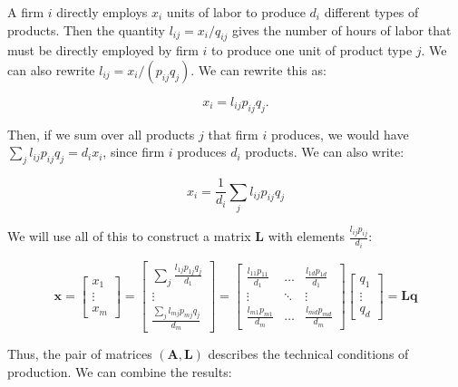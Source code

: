 A firm $i$ directly employs $x_{i}$ units of labor to produce $d_{i}$ different types of products. Then the quantity $l_{ij}=x_{i}/q_{ij}$ gives the number of hours of labor that must be directly employed by firm $i$ to produce one unit of product type $j$. We can also rewrite $l_{ij}=x_{i}/\left(p_{ij}q_{j}\right)$. We can rewrite this as:

\begin{equation}
x_{i}=l_{ij}p_{ij}q_{j}.
\end{equation}

Then, if we sum over all products $j$ that firm $i$ produces, we would have $\sum_{j}l_{ij}p_{ij}q_{j}=d_{i}x_{i}$, since firm $i$ produces $d_{i}$ products. We can also write:


\begin{equation}
x_{i}=\frac{1}{d_{i}}\sum_{j}l_{ij}p_{ij}q_{j}
\end{equation}

We will use all of this to construct a matrix $\boldsymbol{L}$ with elements $\frac{l_{ij}p_{ij}}{d_{i}}$:

\begin{equation}
\boldsymbol{x}=\left[\begin{array}{c}
x_{1}\\
\vdots\\
x_{m}
\end{array}\right]=\left[\begin{array}{c}
\sum_{j}\frac{l_{1j}p_{1j}q_{j}}{d_{1}}\\
\vdots\\
\frac{\sum_{j}l_{mj}p_{mj}q_{j}}{d_{m}}
\end{array}\right]=\left[\begin{array}{ccc}
\frac{l_{11}p_{11}}{d_{1}} & \dots & \frac{l_{1d}p_{1d}}{d_{1}}\\
\vdots & \ddots & \vdots\\
\frac{l_{m1}p_{m1}}{d_{m}} & \dots & \frac{l_{md}p_{md}}{d_{m}}
\end{array}\right]\left[\begin{array}{c}
q_{1}\\
\vdots\\
q_{d}
\end{array}\right]=\boldsymbol{L}\boldsymbol{q}
\end{equation}

Thus, the pair of matrices $\left(\boldsymbol{A},\boldsymbol{L}\right)$ describes the technical conditions of production. We can combine the results:

